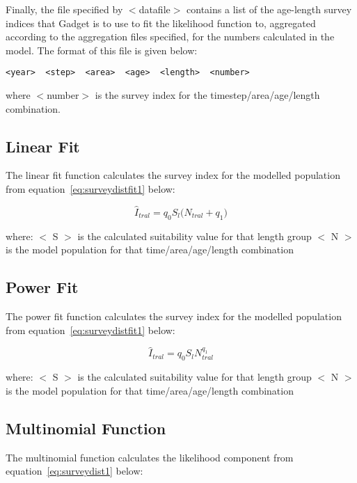 \documentclass[10pt,twoside]{book}
\begin{document}
\bigskip
Finally, the file specified by $<$datafile$>$ contains a list of the age-length survey indices that Gadget is to use to fit the likelihood function to, aggregated according to the aggregation files specified, for the numbers calculated in the model.  The format of this file is given below:

{\small\begin{verbatim}
<year>  <step>  <area>  <age>  <length>  <number>
\end{verbatim}}

where $<$number$>$ is the survey index for the timestep/area/age/length combination.

\subsection{Linear Fit}
The linear fit function calculates the survey index for the modelled population from equation~\ref{eq:surveydistfit1} below:

\begin{equation}\label{eq:surveydistfit1}
\widehat{I}_{tral} = q_{0} S_{l} \big( N_{tral} + q_{1} \big)
\end{equation}

where:\newline
$<$ S $>$ is the calculated suitability value for that length group\newline
$<$ N $>$ is the model population for that time/area/age/length combination

\subsection{Power Fit}
The power fit function calculates the survey index for the modelled population from equation~\ref{eq:surveydistfit1} below:

\begin{equation}\label{eq:surveydistfit2}
\widehat{I}_{tral} = q_{0} S_{l} N_{tral} ^{q_{1}}
\end{equation}

where:\newline
$<$ S $>$ is the calculated suitability value for that length group\newline
$<$ N $>$ is the model population for that time/area/age/length combination

\subsection{Multinomial Function}
The multinomial function calculates the likelihood component from equation~\ref{eq:surveydist1} below:
\end{document}
